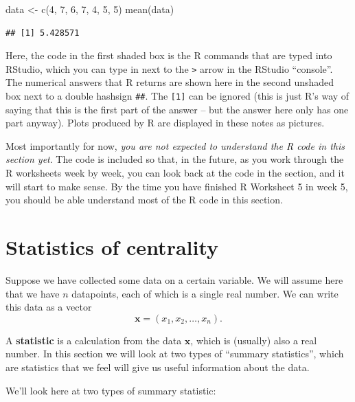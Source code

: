 \documentclass[
  a4paper,
]{book}
\newenvironment{Shaded}{\begin{snugshade}}{\end{snugshade}}
\newcommand{\DecValTok}[1]{\textcolor[rgb]{0.00,0.00,0.81}{#1}}
\newcommand{\FunctionTok}[1]{\textcolor[rgb]{0.00,0.00,0.00}{#1}}
\newcommand{\NormalTok}[1]{#1}
\newcommand{\OtherTok}[1]{\textcolor[rgb]{0.56,0.35,0.01}{#1}}
\theoremstyle{definition}
\theoremstyle{definition}
\theoremstyle{definition}
\theoremstyle{definition}
\theoremstyle{remark}
\begin{document}
\begin{Shaded}
\begin{Highlighting}[]
\NormalTok{data }\OtherTok{\textless{}{-}} \FunctionTok{c}\NormalTok{(}\DecValTok{4}\NormalTok{, }\DecValTok{7}\NormalTok{, }\DecValTok{6}\NormalTok{, }\DecValTok{7}\NormalTok{, }\DecValTok{4}\NormalTok{, }\DecValTok{5}\NormalTok{, }\DecValTok{5}\NormalTok{)}
\FunctionTok{mean}\NormalTok{(data)}
\end{Highlighting}
\end{Shaded}

\begin{verbatim}
## [1] 5.428571
\end{verbatim}

Here, the code in the first shaded box is the R commands that are typed into
RStudio, which you can type in next to the \texttt{\textgreater{}} arrow in the RStudio ``console''. The numerical answers that R returns are shown here in the second unshaded box next to a double hashsign \texttt{\#\#}. The \texttt{{[}1{]}} can be ignored (this is just R's way of saying that this is the first part of the answer -- but the answer here only has one part anyway). Plots produced by R are displayed in these notes as pictures.

Most importantly for now, \emph{you are not expected to understand the R code in this section yet}. The code is included so that, in the future, as you work through the R worksheets week by week, you can look back at the code in the section, and it will start to make sense. By the time you have finished R Worksheet 5 in week 5, you should be able understand most of the R code in this section.

\hypertarget{stat-central}{%
\section{Statistics of centrality}\label{stat-central}}

Suppose we have collected some data on a certain variable. We will assume here that we have \(n\) datapoints, each of which is a single real number. We can write this data as a vector
\[ \mathbf x = (x_1, x_2, \dots, x_n) . \]

A \textbf{statistic} is a calculation from the data \(\mathbf x\), which is (usually) also a real number. In this section we will look at two types of ``summary statistics'', which are statistics that we feel will give us useful information about the data.

We'll look here at two types of summary statistic:
\end{document}
